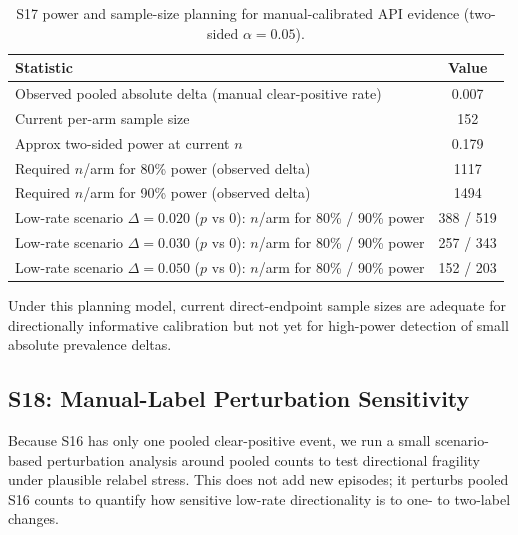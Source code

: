 \begin{table}[t]
\centering
\scriptsize
\caption{S17 power and sample-size planning for manual-calibrated API evidence (two-sided $\alpha=0.05$).}
\begin{tabular}{lc}
\toprule
\textbf{Statistic} & \textbf{Value} \\
\midrule
Observed pooled absolute delta (manual clear-positive rate) & 0.007 \\
Current per-arm sample size & 152 \\
Approx two-sided power at current $n$ & 0.179 \\
Required $n$/arm for 80\% power (observed delta) & 1117 \\
Required $n$/arm for 90\% power (observed delta) & 1494 \\
Low-rate scenario $\Delta=0.020$ ($p$ vs $0$): $n$/arm for 80\% / 90\% power & 388 / 519 \\
Low-rate scenario $\Delta=0.030$ ($p$ vs $0$): $n$/arm for 80\% / 90\% power & 257 / 343 \\
Low-rate scenario $\Delta=0.050$ ($p$ vs $0$): $n$/arm for 80\% / 90\% power & 152 / 203 \\
\bottomrule
\end{tabular}
\label{tab:supp_e17_power}
\end{table}

Under this planning model, current direct-endpoint sample sizes are adequate for directionally informative calibration but not yet for high-power detection of small absolute prevalence deltas.

\subsection{S18: Manual-Label Perturbation Sensitivity}

Because S16 has only one pooled clear-positive event, we run a small scenario-based perturbation analysis around pooled counts to test directional fragility under plausible relabel stress. This does not add new episodes; it perturbs pooled S16 counts to quantify how sensitive low-rate directionality is to one- to two-label changes.

